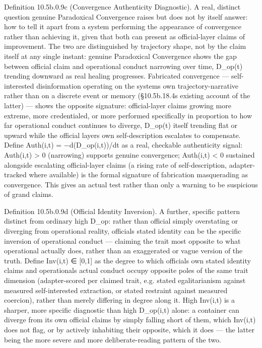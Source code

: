 \documentclass[
]{article}
\begin{document}
Definition 10.5b.0.9c (Convergence Authenticity Diagnostic). A real,
distinct question genuine Paradoxical Convergence raises but does not by
itself answer: how to tell it apart from a system performing the
appearance of convergence rather than achieving it, given that both can
present as official-layer claims of improvement. The two are
distinguished by trajectory shape, not by the claim itself at any single
instant: genuine Paradoxical Convergence shows the gap between official
claim and operational conduct narrowing over time, D\_op(t) trending
downward as real healing progresses. Fabricated convergence ---
self-interested disinformation operating on the systems own
trajectory-narrative rather than on a discrete event or memory
(§10.5b.18.4s existing account of the latter) --- shows the opposite
signature: official-layer claims growing more extreme, more
credentialed, or more performed specifically in proportion to how far
operational conduct continues to diverge, D\_op(t) itself trending flat
or upward while the official layers own self-description escalates to
compensate. Define Auth(i,t) = −d(D\_op(i,t))/dt as a real, checkable
authenticity signal: Auth(i,t) \textgreater{} 0 (narrowing) supports
genuine convergence; Auth(i,t) \textless{} 0 sustained alongside
escalating official-layer claims (a rising rate of self-description,
adapter-tracked where available) is the formal signature of fabrication
masquerading as convergence. This gives an actual test rather than only
a warning to be suspicious of grand claims.

Definition 10.5b.0.9d (Official Identity Inversion). A further, specific
pattern distinct from ordinary high D\_op: rather than official simply
overstating or diverging from operational reality, officials stated
identity can be the specific inversion of operational conduct ---
claiming the trait most opposite to what operational actually does,
rather than an exaggerated or vague version of the truth. Define
Inv(i,t) ∈ {[}0,1{]} as the degree to which officials own stated
identity claims and operationals actual conduct occupy opposite poles of
the same trait dimension (adapter-scored per claimed trait, e.g. stated
egalitarianism against measured self-interested extraction, or stated
restraint against measured coercion), rather than merely differing in
degree along it. High Inv(i,t) is a sharper, more specific diagnostic
than high D\_op(i,t) alone: a container can diverge from its own
official claims by simply falling short of them, which Inv(i,t) does not
flag, or by actively inhabiting their opposite, which it does --- the
latter being the more severe and more deliberate-reading pattern of the
two.
\end{document}

